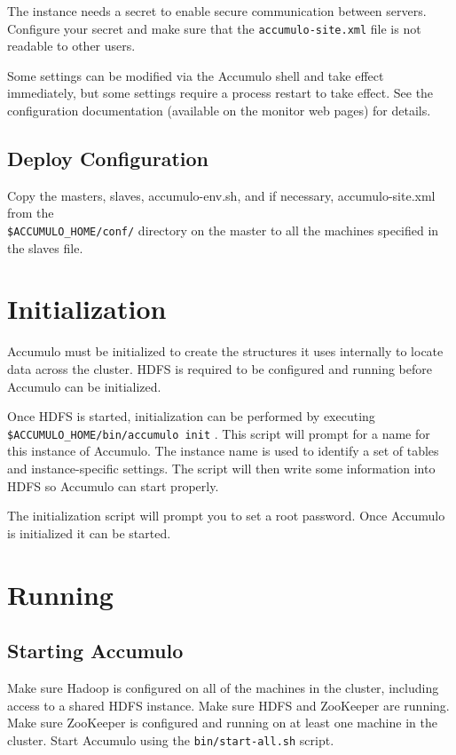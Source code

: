 The instance needs a secret to enable secure communication between servers. Configure your
secret and make sure that the \texttt{accumulo-site.xml} file is not readable to other users.

Some settings can be modified via the Accumulo shell and take effect immediately, but
some settings require a process restart to take effect. See the configuration documentation
(available on the monitor web pages) for details.

\subsection{Deploy Configuration}

Copy the masters, slaves, accumulo-env.sh, and if necessary, accumulo-site.xml
from the\\\texttt{\$ACCUMULO\_HOME/conf/} directory on the master to all the machines
specified in the slaves file.

\section{Initialization}

Accumulo must be initialized to create the structures it uses internally to locate
data across the cluster. HDFS is required to be configured and running before
Accumulo can be initialized.

Once HDFS is started, initialization can be performed by executing\\
\texttt{\$ACCUMULO\_HOME/bin/accumulo init} . This script will prompt for a name
for this instance of Accumulo. The instance name is used to identify a set of tables
and instance-specific settings. The script will then write some information into
HDFS so Accumulo can start properly.

The initialization script will prompt you to set a root password. Once Accumulo is
initialized it can be started.

\section{Running}

\subsection{Starting Accumulo}

Make sure Hadoop is configured on all of the machines in the cluster, including
access to a shared HDFS instance. Make sure HDFS and ZooKeeper are running.
Make sure ZooKeeper is configured and running on at least one machine in the
cluster.
Start Accumulo using the \texttt{bin/start-all.sh} script.

